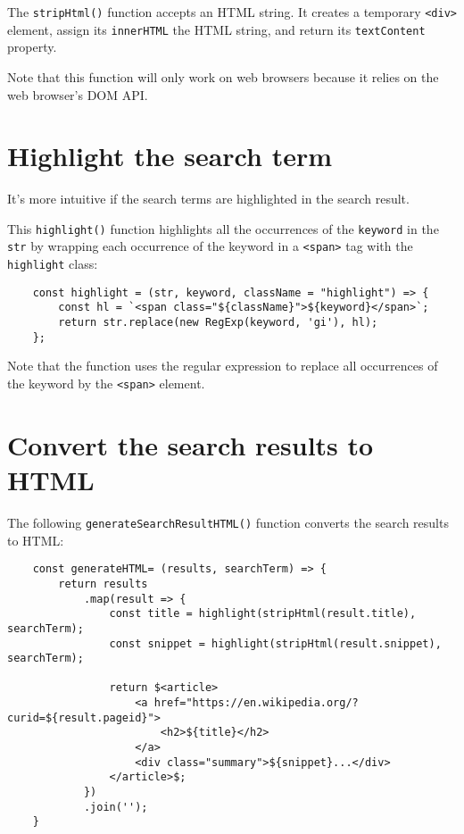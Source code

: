 \documentclass[11pt]{article}
\begin{document}
The \verb|stripHtml()| function accepts an HTML string. It creates a
temporary \verb|<div>| element, assign its \verb|innerHTML| the HTML string,
and return its \verb|textContent| property.

\begin{displayquote}
Note that this function will only work on web browsers because it
relies on the web browser's DOM API.
\end{displayquote}

\section*{Highlight the search term}

It's more intuitive if the search terms are highlighted in the search result.
\newline

\noindent
This \verb|highlight()| function highlights all the occurrences of the
\verb|keyword| in the \verb|str| by wrapping each occurrence of the keyword in
a \verb|<span>| tag with the \verb|highlight| class:

\begin{lstlisting}
    const highlight = (str, keyword, className = "highlight") => {
        const hl = `<span class="${className}">${keyword}</span>`;
        return str.replace(new RegExp(keyword, 'gi'), hl);
    };
\end{lstlisting}

\noindent
Note that the function uses the regular expression to replace all
occurrences of the keyword by the \verb|<span>| element.

\section*{Convert the search results to HTML}

The following \verb|generateSearchResultHTML()| function converts the search
results to HTML:

\begin{lstlisting}
    const generateHTML= (results, searchTerm) => {
        return results
            .map(result => {
                const title = highlight(stripHtml(result.title), searchTerm);
                const snippet = highlight(stripHtml(result.snippet), searchTerm);

                return $<article>
                    <a href="https://en.wikipedia.org/?curid=${result.pageid}">
                        <h2>${title}</h2>
                    </a>
                    <div class="summary">${snippet}...</div>
                </article>$;
            })
            .join('');
    }
\end{lstlisting}
\end{document}
